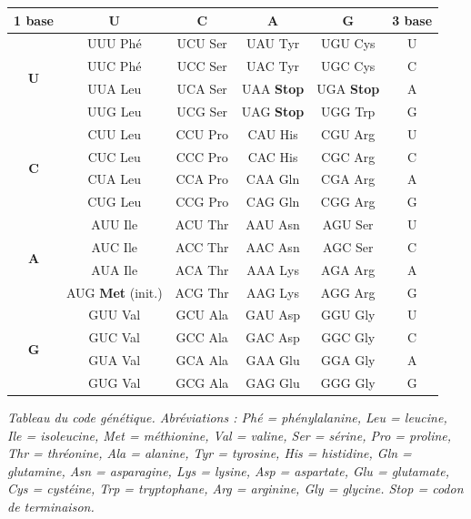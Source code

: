 \documentclass[11pt]{article}
\begin{document}
\begin{center}
\small
{}
\begin{tabular}{|c|c|c|c|c|c|}
\hline
\rowcolor{popblue!40} \textbf{1\iere{} base} & \textbf{U} & \textbf{C} & \textbf{A} & \textbf{G} & \textbf{3\ieme{} base} \\
\hline
\multirow{4}{*}{\textbf{U}} & UUU Phé & UCU Ser & UAU Tyr & UGU Cys & U \\
 & UUC Phé & UCC Ser & UAC Tyr & UGC Cys & C \\
 & UUA Leu & UCA Ser & UAA \textbf{Stop} & UGA \textbf{Stop} & A \\
 & UUG Leu & UCG Ser & UAG \textbf{Stop} & UGG Trp & G \\
\hline
\multirow{4}{*}{\textbf{C}} & CUU Leu & CCU Pro & CAU His & CGU Arg & U \\
 & CUC Leu & CCC Pro & CAC His & CGC Arg & C \\
 & CUA Leu & CCA Pro & CAA Gln & CGA Arg & A \\
 & CUG Leu & CCG Pro & CAG Gln & CGG Arg & G \\
\hline
\multirow{4}{*}{\textbf{A}} & AUU Ile & ACU Thr & AAU Asn & AGU Ser & U \\
 & AUC Ile & ACC Thr & AAC Asn & AGC Ser & C \\
 & AUA Ile & ACA Thr & AAA Lys & AGA Arg & A \\
 & AUG \textbf{Met} (init.) & ACG Thr & AAG Lys & AGG Arg & G \\
\hline
\multirow{4}{*}{\textbf{G}} & GUU Val & GCU Ala & GAU Asp & GGU Gly & U \\
 & GUC Val & GCC Ala & GAC Asp & GGC Gly & C \\
 & GUA Val & GCA Ala & GAA Glu & GGA Gly & A \\
 & GUG Val & GCG Ala & GAG Glu & GGG Gly & G \\
\hline
\end{tabular}
\end{center}

\begin{center}
\emph{Tableau du code génétique. Abréviations : Phé = phénylalanine, Leu = leucine, Ile = isoleucine, Met = méthionine, Val = valine, Ser = sérine, Pro = proline, Thr = thréonine, Ala = alanine, Tyr = tyrosine, His = histidine, Gln = glutamine, Asn = asparagine, Lys = lysine, Asp = aspartate, Glu = glutamate, Cys = cystéine, Trp = tryptophane, Arg = arginine, Gly = glycine. Stop = codon de terminaison.}
\end{center}
\end{document}
